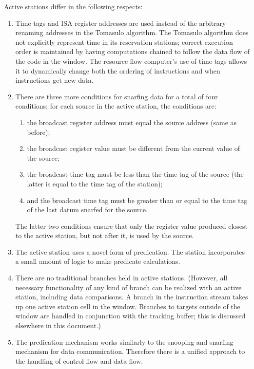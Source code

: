 \documentclass[10pt,dvips]{article}
\begin{document}
Active stations differ in the following respects:
\begin{enumerate}
\item Time tags and ISA register addresses
are used instead of the arbitrary renaming addresses in the Tomasulo algorithm.
The Tomasulo
algorithm does not explicitly represent time in its reservation stations;
correct execution order is maintained by having computations chained to
follow the data flow of the code in the window. The resource flow computer's
use of time tags allows it to dynamically change both the ordering of instructions
and when instructions get new data.

\item There are three more conditions for snarfing data for a total of four
conditions; for each source in the active station, the conditions are:
\begin{enumerate}
\item the broadcast register address must equal the source address (same
as before);

\item the broadcast register value must be different from the current
value of the source;

\item the broadcast time tag must be less than the time tag of the source (the
latter is equal to the time tag of the station);

\item and the broadcast time tag must be greater than or equal to the time tag of
the last datum snarfed for the source.
\end{enumerate}

The latter two conditions ensure that only the register value produced
closest to the active station, but not after it, is used by the source.

\item The active station uses a novel form of predication. The station
incorporates a small amount of logic to make predicate calculations.

\item There are no traditional
branches held in active stations. (However, all necessary functionality of
any kind of branch can be realized with an active station, including
data comparisons. A branch in the instruction stream takes up one active
station cell in the window. Branches to targets outside of the window
are handled in conjunction with the tracking buffer; this is discussed
elsewhere in this document.)

\item The predication mechanism works similarly to the snooping and snarfing
mechanism for data communication. Therefore there is a unified approach to
the handling of control flow and data flow.
\end{enumerate}
\end{document}
